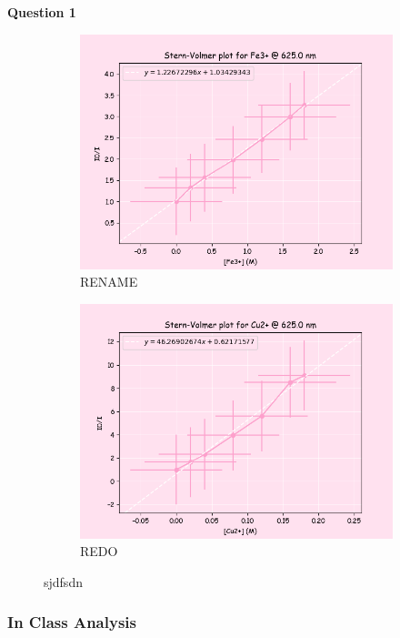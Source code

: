 \textbf{Question 1}
\begin{figure}[H]
     \centering
     \begin{subfigure}[b]{0.7\textwidth}
         \centering
         \includegraphics[width=\textwidth]{part1_q1_Fe.png}
         \caption{RENAME}
         \label{fig:part2_q1_a}
     \end{subfigure}
     \hfill
     \begin{subfigure}[b]{0.7\textwidth}
         \centering
         \includegraphics[width=\textwidth]{part1_q1_Cu.png}
         \caption{REDO}
         \label{fig:part2_q1_b}
     \end{subfigure}
     \caption{sjdfsdn}
     \label{fig:part2q1}
\end{figure}
\subsubsection*{In Class Analysis}